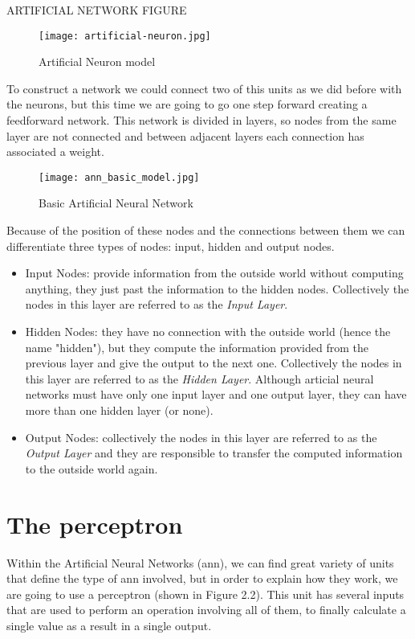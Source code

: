ARTIFICIAL NETWORK FIGURE

\begin{figure}[ht]
	\centering
	\texttt{[image: artificial-neuron.jpg]}
	\caption{Artificial Neuron model}
	\label{fig:art_neuron}
\end{figure}

To construct a network we could connect two of this units as we did before with the neurons, but this time we are going to go one step forward creating a feedforward network. This network is divided in layers, so nodes from the same layer are not connected and between adjacent layers each connection has associated a weight. 

\begin{figure}[ht]
	\centering
	\texttt{[image: ann\_basic\_model.jpg]}
	\caption{Basic Artificial Neural Network}
\end{figure}

Because of the position of these nodes and the connections between them we can differentiate three types of nodes: input, hidden and output nodes.

\begin{itemize}
	\item Input Nodes: provide information from the outside world without computing anything, they just past the information to the hidden nodes. Collectively the nodes in this layer are referred to as the \textit{Input Layer}. 
	\item Hidden Nodes: they have no connection with the outside world (hence the name "hidden"), but they compute the information provided from the previous layer and give the output to the next one. Collectively the nodes in this layer are referred to as the \textit{Hidden Layer}. Although articial neural networks must have only one input layer and one output layer, they can have more than one hidden layer (or none). 
	\item Output Nodes: collectively the nodes in this layer are referred to as the \textit{Output Layer} and they are responsible to transfer the computed information to the outside world again.
\end{itemize}


\section{The perceptron}
Within the Artificial Neural Networks (\gls{ann}), we can find great variety of units that define the type of \gls{ann} involved, but in order to explain how they work, we are going to use a perceptron (shown in Figure 2.2). This unit has several inputs that are used to perform an operation involving all of them, to finally calculate a single value as a result in a single output.

